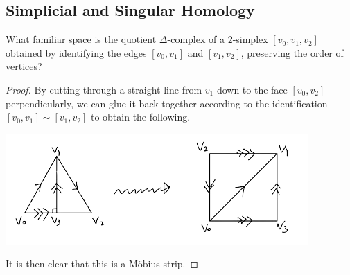 \documentclass[a4paper]{article}
\begin{document}
\subsection{Simplicial and Singular Homology}
\begin{ex}{}{} What familiar space is the quotient $\Delta$-complex of a $2$-simplex $[v_0,v_1,v_2]$ obtained by identifying the edges $[v_0,v_1]$ and $[v_1,v_2]$, preserving the order of vertices? \tcbline
\begin{proof}
By cutting through a straight line from $v_1$ down to the face $[v_0,v_2]$ perpendicularly, we can glue it back together according to the identification $[v_0,v_1]\sim[v_1,v_2]$ to obtain the following. 

\begin{center}
\includegraphics[scale = 0.8]{Image 2}
\end{center}

It is then clear that this is a Möbius strip. 
\end{proof}
\end{ex}
\end{document}
